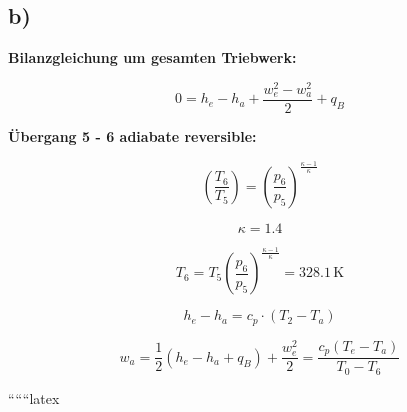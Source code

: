 

\subsection*{b)}

\textbf{Bilanzgleichung um gesamten Triebwerk:}

\[
0 = h_e - h_a + \frac{w_e^2 - w_a^2}{2} + q_B
\]

\textbf{Übergang 5 - 6 adiabate reversible:}

\[
\left( \frac{T_6}{T_5} \right) = \left( \frac{p_6}{p_5} \right)^{\frac{\kappa - 1}{\kappa}}
\]

\[
\kappa = 1.4
\]

\[
T_6 = T_5 \left( \frac{p_6}{p_5} \right)^{\frac{\kappa - 1}{\kappa}} = 328.1 \, \text{K}
\]

\[
h_e - h_a = c_p \cdot (T_2 - T_a)
\]

\[
w_a = \frac{1}{2} (h_e - h_a + q_B) + \frac{w_e^2}{2} = \frac{c_p (T_e - T_a)}{T_0 - T_6}
\]

``````latex